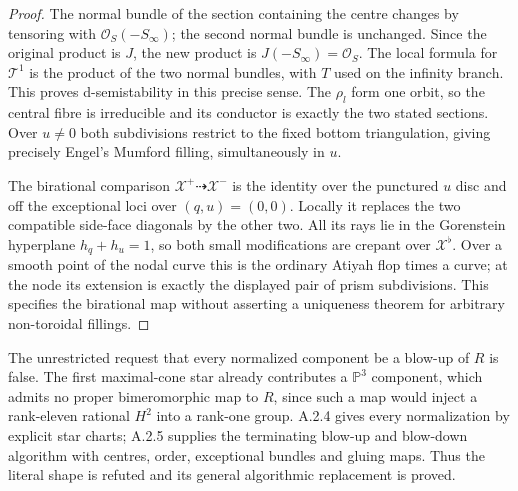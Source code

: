 \begin{proof}
The normal bundle of the section containing the centre changes
by tensoring with $\mathcal O_S(-S_\infty)$; the second normal
bundle is unchanged. Since the original product is $J$, the
new product is $J(-S_\infty)=\mathcal O_S$. The local
formula for $\mathcal T^1$ is the product of the two normal
bundles, with $T$ used on the infinity branch. This proves
d-semistability in this precise sense. The $\rho_l$ form one
orbit, so the central fibre is irreducible and its conductor is
exactly the two stated sections. Over $u\ne0$ both subdivisions
restrict to the fixed bottom triangulation, giving precisely
Engel's Mumford filling, simultaneously in $u$.

The birational comparison $\mathcal X^+\dashrightarrow
\mathcal X^-$ is the identity over the punctured $u$ disc and
off the exceptional loci over $(q,u)=(0,0)$. Locally it replaces
the two compatible side-face diagonals by the other two.
All its rays lie in the Gorenstein hyperplane $h_q+h_u=1$,
so both small modifications are crepant over
$\mathcal X^\flat$. Over a smooth point of the nodal curve
this is the ordinary Atiyah flop times a curve; at the node its
extension is exactly the displayed pair of prism subdivisions.
This specifies the birational map without asserting a uniqueness
theorem for arbitrary non-toroidal fillings.
\end{proof}

\begin{remark}\label{push:A23}
The unrestricted request that every normalized component
be a blow-up of $R$ is false. The first maximal-cone
star already contributes a $\mathbb P^3$ component,
which admits no proper bimeromorphic map to $R$, since
such a map would inject a rank-eleven rational $H^2$
into a rank-one group. A.2.4 gives every normalization
by explicit star charts; A.2.5 supplies the terminating
blow-up and blow-down algorithm with centres, order,
exceptional bundles and gluing maps. Thus the literal
shape is refuted and its general algorithmic
replacement is proved.
\end{remark}

